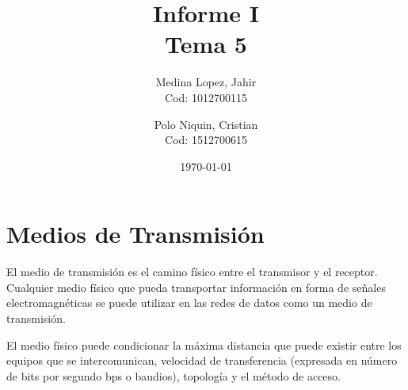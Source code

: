 \documentclass[a4paper]{article}
\title{{\LARGE Informe I
\\
{Tema 5}}}
\author{
	\large{Medina Lopez, Jahir}
	\\
  \small{Cod: 1012700115}
  \and
  \large{Polo Niquin, Cristian}
	\\
	\small{Cod: 1512700615}
	}
\begin{document}
\vfill

\maketitle

\vfill

\noindent{}

\begin{center}
{\LARGE 	\date{\today}}
\end{center}

\vfill

\pagebreak



\tableofcontents

\section{Medios de Transmisi\'on}
\label{sec:theory}

El medio de transmisión es el camino físico entre el transmisor y el
receptor. Cualquier medio físico que pueda transportar información en
forma de señales electromagnéticas se puede utilizar en las redes de
datos como un medio de transmisión.

El medio físico puede condicionar la máxima distancia que puede existir
entre los equipos que se intercomunican, velocidad de transferencia
(expresada en número de bits por segundo bps o baudios), topología y el
método de acceso.
\end{document}
